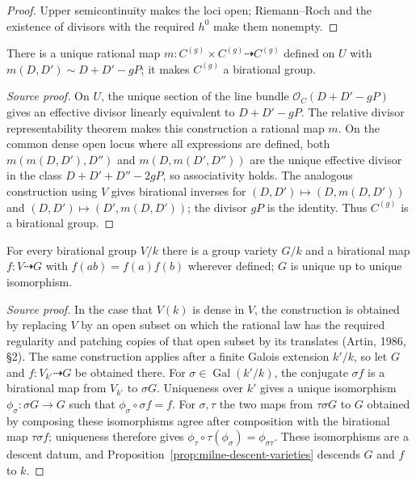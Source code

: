 \begin{proof}
Upper semicontinuity makes the loci open; Riemann--Roch and the existence of divisors with the required $h^0$ make them nonempty.

\end{proof}

\begin{proposition}\label{prop:milne-weil-birational-group}
There is a unique rational map $m:C^{(g)}\times C^{(g)}\dashrightarrow C^{(g)}$ defined on $U$ with $m(D,D')\sim D+D'-gP$; it makes $C^{(g)}$ a birational group.
\end{proposition}

\begin{proof}[Source proof]
On $U$, the unique section of the line bundle
$\mathcal O_C(D+D'-gP)$ gives an effective divisor linearly equivalent to
$D+D'-gP$.  The relative divisor representability theorem makes this
construction a rational map $m$.  On the common dense open locus where all
expressions are defined, both $m(m(D,D'),D'')$ and $m(D,m(D',D''))$ are the
unique effective divisor in the class $D+D'+D''-2gP$, so associativity holds.
The analogous construction using $V$ gives birational inverses for
$(D,D')\mapsto(D,m(D,D'))$ and $(D,D')\mapsto(D',m(D,D'))$; the divisor $gP$
is the identity.  Thus $C^{(g)}$ is a birational group.
\end{proof}

\begin{theorem}\label{thm:milne-weil-birational-group-completion}
For every birational group $V/k$ there is a group variety $G/k$ and a birational map $f:V\dashrightarrow G$ with $f(ab)=f(a)f(b)$ wherever defined; $G$ is unique up to unique isomorphism.
\end{theorem}

\begin{proof}[Source proof]
In the case that $V(k)$ is dense in $V$, the construction is obtained by
replacing $V$ by an open subset on which the rational law has the required
regularity and patching copies of that open subset by its translates (Artin,
1986, \S2).  The same construction applies after a finite Galois extension
$k'/k$, so let $G$ and $f:V_{k'}\dashrightarrow G$ be obtained there.  For
$\sigma\in\operatorname{Gal}(k'/k)$, the conjugate $\sigma f$ is a birational
map from $V_{k'}$ to $\sigma G$.  Uniqueness over $k'$ gives a unique
isomorphism $\phi_\sigma:\sigma G\to G$ such that
$\phi_\sigma\circ\sigma f=f$.  For $\sigma,\tau$ the two maps from
$\tau\sigma G$ to $G$ obtained by composing these isomorphisms agree after
composition with the birational map $\tau\sigma f$; uniqueness therefore
gives $\phi_\tau\circ\tau(\phi_\sigma)=\phi_{\sigma\tau}$.  These
isomorphisms are a descent datum, and Proposition~\ref{prop:milne-descent-varieties}
descends $G$ and $f$ to $k$.

\end{proof}

